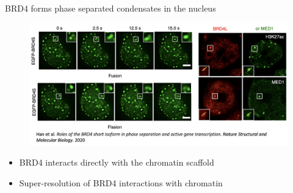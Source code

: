\documentclass{beamer}					%
\begin{document}

\begin{frame}{BRD4 forms phase separated condensates in the nucleus}
\begin{figure}
\includegraphics[width=13cm]{Fission.png}
\end{figure}
\begin{itemize}
\item BRD4 interacts directly with the chromatin scaffold
\item Super-resolution of BRD4 interactions with chromatin
\end{itemize}
\end{frame}
\end{document}
